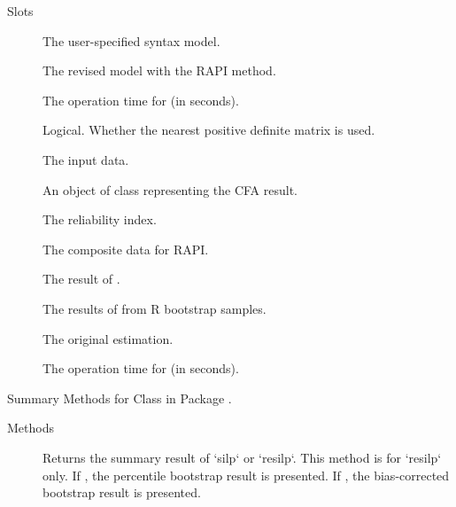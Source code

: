\documentclass[a4paper]{book}
\begin{document}
\begin{Section}{Slots}

\begin{description}

\item[] The user-specified  syntax model.

\item[] The revised model with the RAPI method.

\item[] The operation time for  (in seconds).

\item[] Logical. Whether the nearest positive definite matrix is used.

\item[] The input data.

\item[] An object of class  representing the CFA result.

\item[] The reliability index.

\item[] The composite data for RAPI.

\item[] The result of .

\item[] The results of  from R bootstrap samples.

\item[] The original  estimation.

\item[] The operation time for  (in seconds).

\end{description}
\end{Section}
%
\begin{Description}
Summary Methods for Class  in Package .
\end{Description}
%
\begin{Section}{Methods}
\begin{description}

\item[] 
Returns the summary result of `silp` or `resilp`. This method is for `resilp` only. If , the percentile bootstrap result is presented. If , the bias-corrected bootstrap result is presented. 


\end{description}
\end{Section}
\printindex{}
\end{document}
